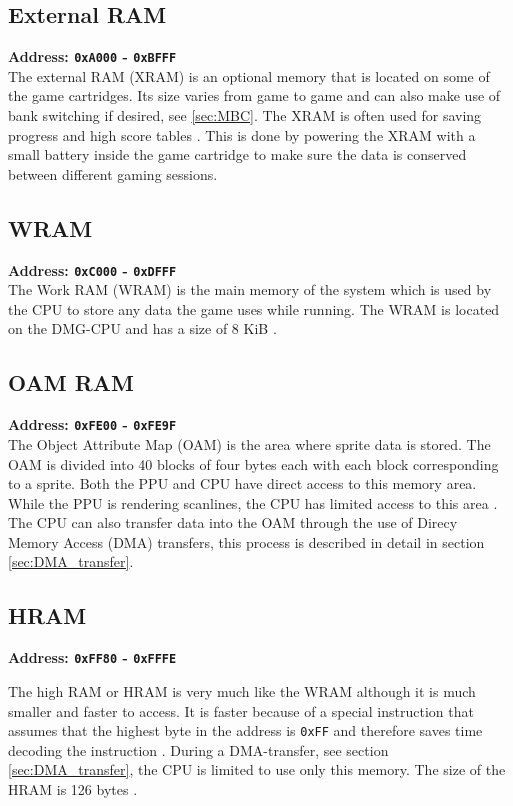\subsection{External RAM}
\textbf{Address: \texttt{0xA000} - \texttt{0xBFFF}}
\\
The external RAM (XRAM) is an optional memory that is located on some of the game cartridges. Its size varies from game to game and can also make use of bank switching if desired, see \ref{sec:MBC}. The XRAM is often used for saving progress and high score tables \cite{pandocsmemorymap}. This is done by powering the XRAM with a small battery inside the game cartridge to make sure the data is conserved between different gaming sessions. 

\subsection{WRAM}
\textbf{Address: \texttt{0xC000} - \texttt{0xDFFF}}
\\
The Work RAM (WRAM) is the main memory of the system which is used by the CPU to store any data the game uses while running. The WRAM is located on the DMG-CPU and has a size of 8 KiB \cite{pandocsmemorymap}.


\subsection{OAM RAM}
\textbf{Address: \texttt{0xFE00} - \texttt{0xFE9F}}
\\
The Object Attribute Map (OAM) is the area where sprite data is stored. The OAM is divided into 40 blocks of four bytes each with each block corresponding to a sprite. Both the PPU and CPU have direct access to this memory area. While the PPU is rendering scanlines, the CPU has limited access to this area \cite{pandocsoam}. The CPU can also transfer data into the OAM through the use of Direcy Memory Access (DMA) transfers, this process is described in detail in section \ref{sec:DMA_transfer}.


\subsection{HRAM}
\textbf{Address: \texttt{0xFF80} - \texttt{0xFFFE}}

The high RAM or HRAM is very much like the WRAM although it is much smaller and faster to access. 
It is faster because of a special instruction that assumes that the highest byte in the address is \texttt{0xFF} and therefore saves time decoding the instruction \cite{OpCodes}. 
During a DMA-transfer, see section \ref{sec:DMA_transfer}, the CPU is limited to use only this memory.
The size of the HRAM is 126 bytes \cite{pandocsmemorymap}. 

